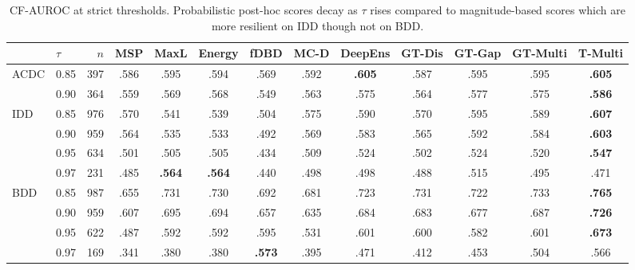 \documentclass{article}
\newcommand{\win}[1]{\textcolor{wingreen}{\textbf{#1}}}
\newcommand{\loss}[1]{\textcolor{lossred}{#1}}
\begin{document}
\begin{table}[H]
\centering
\small
\setlength{\tabcolsep}{3pt}
\caption{CF-AUROC at strict thresholds. Probabilistic post-hoc scores decay as $\tau$ rises compared to magnitude-based scores which are more resilient on IDD though not on BDD.}
\label{tab:strict}
\begin{tabular}{llrcccccccccc}
\toprule
 & $\tau$ & $n$ & MSP & MaxL & Energy & fDBD & MC-D & DeepEns & GT-Dis & GT-Gap & GT-Multi & \textbf{T-Multi} \\
\midrule
\multirow{2}{*}{ACDC}
 & 0.85 & 397 & .586 & .595 & .594 & \loss{.569} & .592 & \win{.605} & .587 & .595 & .595 & \win{.605} \\
 & 0.90 & 364 & .559 & .569 & .568 & \loss{.549} & .563 & .575 & .564 & .577 & .575 & \win{.586} \\
\midrule
\multirow{4}{*}{IDD}
 & 0.85 & 976 & .570 & .541 & .539 & \loss{.504} & .575 & .590 & .570 & .595 & .589 & \win{.607} \\
 & 0.90 & 959 & .564 & .535 & .533 & \loss{.492} & .569 & .583 & .565 & .592 & .584 & \win{.603} \\
 & 0.95 & 634 & .501 & .505 & .505 & \loss{.434} & .509 & .524 & .502 & .524 & .520 & \win{.547} \\
 & 0.97 & 231 & .485 & \win{.564} & \win{.564} & \loss{.440} & .498 & .498 & .488 & .515 & .495 & .471 \\
\midrule
\multirow{4}{*}{BDD}
 & 0.85 & 987 & \loss{.655} & .731 & .730 & .692 & .681 & .723 & .731 & .722 & .733 & \win{.765} \\
 & 0.90 & 959 & \loss{.607} & .695 & .694 & .657 & .635 & .684 & .683 & .677 & .687 & \win{.726} \\
 & 0.95 & 622 & \loss{.487} & .592 & .592 & .595 & .531 & .601 & .600 & .582 & .601 & \win{.673} \\
 & 0.97 & 169 & \loss{.341} & .380 & .380 & \win{.573} & .395 & .471 & .412 & .453 & .504 & .566 \\
\bottomrule
\end{tabular}
\end{table}
\end{document}

